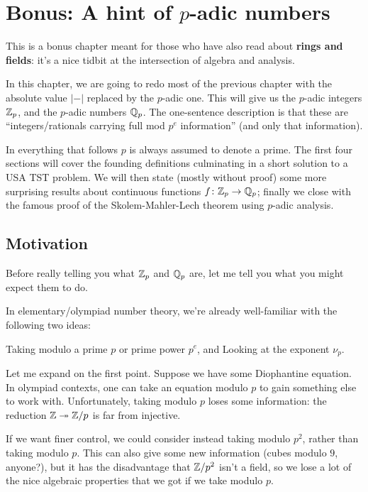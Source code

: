 \chapter[Bonus: A hint of p-adic numbers]{Bonus: A hint of $p$-adic numbers}
This is a bonus chapter meant for those
who have also read about \textbf{rings and fields}:
it's a nice tidbit at the intersection of algebra and analysis.

In this chapter, we are going to redo most of the previous chapter
with the absolute value $\left\lvert - \right\rvert$
replaced by the $p$-adic one.
This will give us the $p$-adic integers $\mathbb Z_p$,
and the $p$-adic numbers $\mathbb Q_p$.
The one-sentence description is that these are
``integers/rationals carrying full mod $p^e$ information''
(and only that information).

In everything that follows $p$ is always assumed to denote a prime.
The first four sections will cover the founding definitions
culminating in a short solution to a USA TST problem.
We will then state (mostly without proof) some more
surprising results about continuous functions $f \colon \mathbb Z_p \to \mathbb Q_p$;
finally we close with the famous proof of the Skolem-Mahler-Lech theorem
using $p$-adic analysis.

\section{Motivation}
Before really telling you what $\mathbb Z_p$ and $\mathbb Q_p$ are,
let me tell you what you might expect them to do.

In elementary/olympiad number theory,
we're already well-familiar with the following two ideas:
\begin{itemize}
	\ii Taking modulo a prime $p$ or prime power $p^e$, and
	\ii Looking at the exponent $\nu_p$.
\end{itemize}

Let me expand on the first point.
Suppose we have some Diophantine equation.
In olympiad contexts, one can take an equation modulo $p$
to gain something else to work with.
Unfortunately, taking modulo $p$ loses some information:
the reduction $\mathbb Z \twoheadrightarrow \mathbb Z/p$ is far from injective.

If we want finer control, we could consider instead
taking modulo $p^2$, rather than taking modulo $p$.
This can also give some new information (cubes modulo $9$, anyone?),
but it has the disadvantage that $\mathbb Z/p^2$ isn't a field,
so we lose a lot of the nice algebraic properties that we
got if we take modulo $p$.


